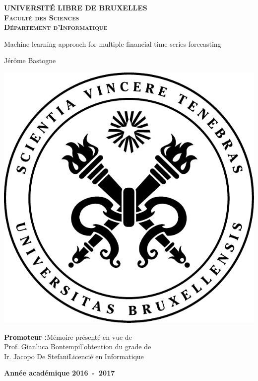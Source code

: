 \documentclass[11pt,a4paper,oneside]{book}
\begin{document}
\nocite{*}

\begin{titlepage}
\begin{center}
\textbf{\textsc{UNIVERSIT\'E LIBRE DE BRUXELLES}}\\
\textbf{\textsc{Faculté des Sciences}}\\
\textbf{\textsc{Département d'Informatique}}
\vfill{}\vfill{}

\begin{center}{\Huge Machine learning approach for multiple financial time series forecasting}\end{center}{\Huge \par}
\begin{center}{\large Jérôme Bastogne}\end{center}{\Huge \par}
\vfill{}\vfill{}
\includegraphics[keepaspectratio=true,scale=0.9]{img/ulbBlack.pdf}
\vfill{}\vfill{}
\begin{flushright}{\large \textbf{Promoteur :}}\hfill{}{\large Mémoire présenté en vue de}\\
{\large Prof. Gianluca Bontempi}\hfill{}{\large l'obtention du grade de}\\
{\large Ir. Jacopo De Stefani}\hfill{}{\large Licencié en Informatique}\end{flushright}{\large\par}
\enlargethispage{1cm}
\textbf{Année académique 2016~-~2017}
\end{center}
\end{titlepage}
\end{document}
